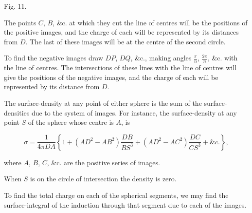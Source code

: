 \documentclass[11pt,a4paper]{article}
\begin{document}
\begin{center}

Fig. 11.
\end{center}

The points $C$, $B$, \&c. at which they cut the line of centres will be
the positions of the positive images, and the charge of each will be
represented by its distances from $D$. The last of these images will
be at the centre of the second circle.

To find the negative images draw $DP$, $DQ$, \&c., making angles
$\frac{\pi}{n}$, $\frac{2\pi}{n}$, \&c. with the line of centres. The
intersections of these lines with the line of centres will give the
positions of the negative images, and the charge of each will be
represented by its distance from $D$.

The surface-density at any point of either sphere is the sum of the
surface-densities due to the system of images. For instance, the
surface-density at any point $S$ of the sphere whose centre is $A$, is

\[
\sigma = \frac{1}{4\pi DA}\left\{
1+(AD^2-AB^2)\frac{DB}{BS^3}
 +(AD^2-AC^2)\frac{DC}{CS^3}+\&c.\right\},
\]

where $A$, $B$, $C$, \&c. are the positive series of images.

When $S$ is on the circle of intersection the density is zero.

To find the total charge on each of the spherical segments, we may find
the surface-integral of the induction through that segment due to each
of the images.
\end{document}
